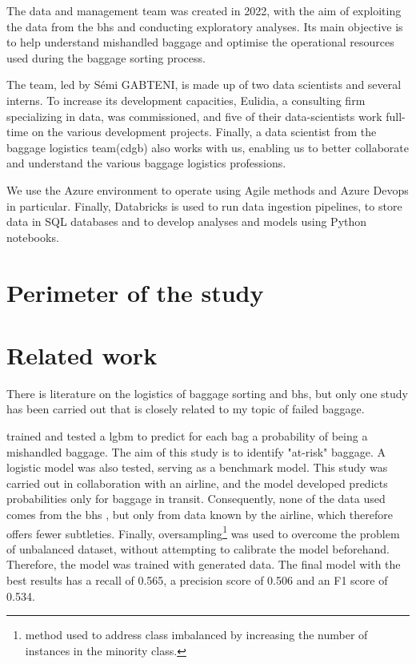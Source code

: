 \documentclass[12pt]{article}
\begin{document}
The data and management team was created in 2022, with the aim of exploiting the data from the \acrshort{bhs} and conducting exploratory analyses. Its main objective is to help understand mishandled baggage and optimise the operational resources used during the baggage sorting process.

The team, led by Sémi GABTENI, is made up of two data scientists and several interns. To increase its development capacities, Eulidia, a consulting firm specializing in data, was commissioned, and five of their data-scientists work full-time on the various development projects. Finally, a data scientist from the baggage logistics team(\acrshort{cdgb})  also works with us, enabling us to better collaborate and understand the various baggage logistics professions.

We use the Azure environment to operate using Agile methods and Azure Devops in particular. Finally, Databricks is used to run data ingestion pipelines, to store data in SQL databases and to develop analyses and models using Python notebooks.



\section{Perimeter of the study}



\section{Related work}

There is literature on the logistics of baggage sorting and \acrlong{bhs}, but only one study has been carried out that is closely related to my topic of failed baggage. \hfill \break

\cite{MishandledBgas} trained and tested a \acrlong{lgbm} to predict for each bag a probability of being a mishandled baggage. The aim of this study is to identify "at-risk" baggage. A logistic model was also tested, serving as a benchmark model. \hfill \break 
\noindent This study was carried out in collaboration with an airline, and the model developed predicts probabilities only for baggage in transit. Consequently, none of the data used comes from the \acrshort{bhs} , but only from data known by the airline, which therefore offers fewer subtleties. Finally, oversampling\footnote{method used to address class imbalanced by increasing the number of instances in the minority class.} was used to overcome the problem of unbalanced dataset, without attempting to calibrate the model beforehand. Therefore, the model was trained with generated data. \hfill \break
\noindent The final model with the best results has a recall of 0.565, a precision score of 0.506 and an F1 score of 0.534. \hfill \break
\end{document}
